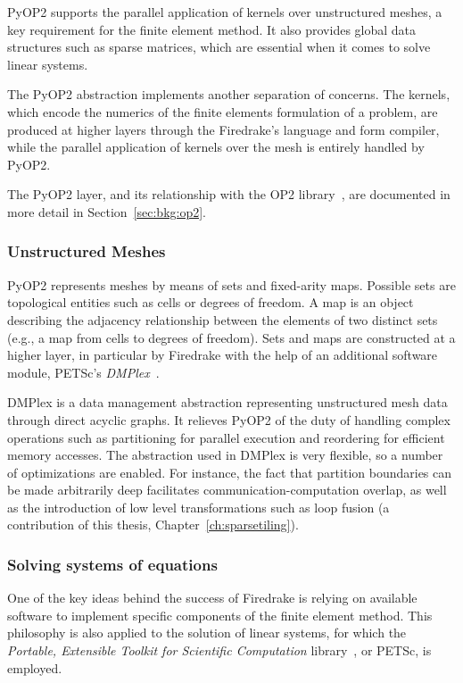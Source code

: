 PyOP2 supports the parallel application of kernels over unstructured meshes, a key requirement for the finite element method. It also provides global data structures such as sparse matrices, which are essential when it comes to solve linear systems.

The PyOP2 abstraction implements another separation of concerns. The kernels, which encode the numerics of the finite elements formulation of a problem, are produced at higher layers through the Firedrake's language and form compiler, while the parallel application of kernels over the mesh is entirely handled by PyOP2. 

The PyOP2 layer, and its relationship with the OP2 library~\cite{op2-main}, are documented in more detail in Section~\ref{sec:bkg:op2}.


 \subsubsection{Unstructured Meshes}
 \label{sec:bkg:dmplex}
PyOP2 represents meshes by means of sets and fixed-arity maps. Possible sets are topological entities such as cells or degrees of freedom. A map is an object describing the adjacency relationship between the elements of two distinct sets (e.g., a map from cells to degrees of freedom). Sets and maps are constructed at a higher layer, in particular by Firedrake with the help of an additional software module, PETSc's {\em DMPlex}~\citep{dmplex-cite}. 
 
DMPlex is a data management abstraction representing unstructured mesh data through direct acyclic graphs. It relieves PyOP2 of the duty of handling complex operations such as partitioning for parallel execution and reordering for efficient memory accesses. The abstraction used in DMPlex is very flexible, so a number of optimizations are enabled. For instance, the fact that partition boundaries can be made arbitrarily deep facilitates communication-computation overlap, as well as the introduction of low level transformations such as loop fusion (a contribution of this thesis, Chapter~\ref{ch:sparsetiling}).
 
 \subsubsection{Solving systems of equations}
One of the key ideas behind the success of Firedrake is relying on available software to implement specific components of the finite element method. This philosophy is also applied to the solution of linear systems, for which the {\em Portable, Extensible Toolkit for Scientific Computation} library~\citep{petsc-cite}, or PETSc, is employed. 

